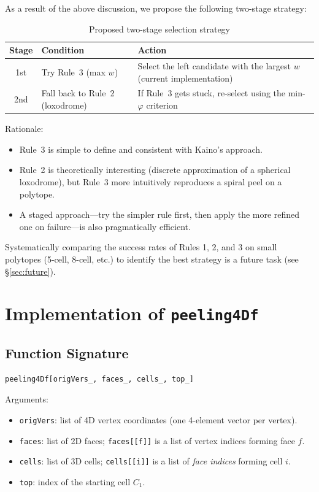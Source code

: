 \documentclass[12pt,a4paper]{article}
\theoremstyle{definition}
\begin{document}
As a result of the above discussion, we propose the following two-stage
strategy:

\begin{table}[h]
\centering
\caption{Proposed two-stage selection strategy}
\label{tab:twostage}
\begin{tabular}{cll}
\toprule
Stage & Condition & Action \\
\midrule
1st & Try Rule~3 (max $w$) &
  Select the left candidate with the largest $w$ (current implementation) \\
2nd & Fall back to Rule~2 (loxodrome) &
  If Rule~3 gets stuck, re-select using the min-$\varphi$ criterion \\
\bottomrule
\end{tabular}
\end{table}

Rationale:
\begin{itemize}
  \item Rule~3 is simple to define and consistent with Kaino's approach.
  \item Rule~2 is theoretically interesting (discrete approximation of a
        spherical loxodrome), but Rule~3 more intuitively reproduces a
        spiral peel on a polytope.
  \item A staged approach---try the simpler rule first, then apply the more
        refined one on failure---is also pragmatically efficient.
\end{itemize}

Systematically comparing the success rates of Rules 1, 2, and 3 on small
polytopes (5-cell, 8-cell, etc.) to identify the best strategy is a future
task (see \S\ref{sec:future}).


\section{Implementation of \texttt{peeling4Df}}

\subsection{Function Signature}

\begin{lstlisting}
peeling4Df[origVers_, faces_, cells_, top_]
\end{lstlisting}

\noindent Arguments:
\begin{itemize}
  \item \texttt{origVers}: list of 4D vertex coordinates
        (one 4-element vector per vertex).
  \item \texttt{faces}: list of 2D faces; \texttt{faces[[f]]} is a list of
        vertex indices forming face $f$.
  \item \texttt{cells}: list of 3D cells; \texttt{cells[[i]]} is a list of
        \emph{face indices} forming cell $i$.
  \item \texttt{top}: index of the starting cell $C_1$.
\end{itemize}
\end{document}

